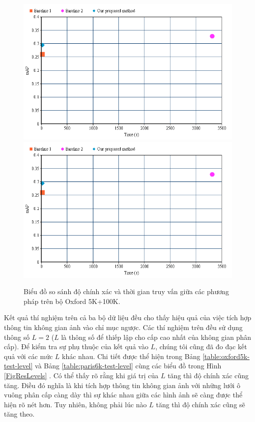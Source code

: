 \begin{figure}[!htbp]
  \begin{center}
    \leavevmode
    \ifpdf
      \includegraphics[scale=0.42]{1_chart}
    \else
      \includegraphics[scale=0.42]{1_chart}
    \fi
    \caption[Biểu đồ so sánh độ chính xác và thời gian truy vấn giữa các phương pháp]{Biểu đồ so sánh độ chính xác và thời gian truy vấn giữa các phương pháp trên bộ Oxford 5K+100K.}
    \label{Fig1Chart}
  \end{center}
\end{figure}

Kết quả thí nghiệm trên cả ba bộ dữ liệu đều cho thấy hiệu quả của việc tích hợp thông tin không gian ảnh vào chỉ mục ngược. Các thí nghiệm trên đều sử dụng thông số $L = 2$ ($L$ là thông số để thiếp lập cho cấp cao nhất của không gian phân cấp). Để kiểm tra sự phụ thuộc của kết quả vào $L$, chúng tôi cũng đã đo đạc kết quả với các mức $L$ khác nhau. Chi tiết được thể hiện trong Bảng \ref{table:oxford5k-test-level} và Bảng \ref{table:paris6k-test-level} cùng các biểu đồ trong Hình \ref{FigResLevels} . Có thể thấy rõ rằng khi giá trị của $L$ tăng thì độ chính xác cũng tăng. Điều đó nghĩa là khi tích hợp thông tin không gian ảnh với những lưới ô vuông phân cấp càng dày thì sự khác nhau giữa các hình ảnh sẽ càng được thể hiện rõ nét hơn. Tuy nhiên, không phải lúc nào $L$ tăng thì độ chính xác cũng sẽ tăng theo.

